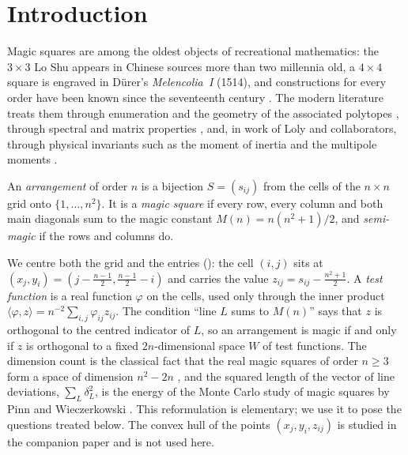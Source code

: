 \section{Introduction}
\label{sec:introduction}

Magic squares are among the oldest objects of recreational mathematics: the $3\times3$ Lo Shu appears in Chinese sources more than two millennia old, a $4\times4$ square is engraved in D\"urer's \emph{Melencolia~I} (1514), and constructions for every order have been known since the seventeenth century \cite{andrews1960magic,pickover2002zen}.
The modern literature treats them through enumeration and the geometry of the associated polytopes \cite{stanley1973magic,ehrhart1973magic,ahmed2003polyhedral,beck2006insideout,beck2010enumeration}, through spectral and matrix properties \cite{loly2009spectra,nordgren2012properties,nordgren2014spectra,cameron2013signatura}, and, in work of Loly and collaborators, through physical invariants such as the moment of inertia and the multipole moments \cite{loly2004invariance,rogers2004inertia,rogers2005multipole}.

\begin{definition}
\label{def:magic_square}
An \emph{arrangement} of order $n$ is a bijection $S=(s_{ij})$ from the cells of the $n\times n$ grid onto $\{1,\dots,n^2\}$.
It is a \emph{magic square} if every row, every column and both main diagonals sum to the magic constant $M(n)=n(n^2+1)/2$, and \emph{semi-magic} if the rows and columns do.
\end{definition}

We centre both the grid and the entries (): the cell $(i,j)$ sits at $(x_j,y_i)=(j-\frac{n-1}2,\frac{n-1}2-i)$ and carries the value $z_{ij}=s_{ij}-\frac{n^2+1}2$.
A \emph{test function} is a real function $\varphi$ on the cells, used only through the inner product $\langle\varphi,z\rangle=n^{-2}\sum_{i,j}\varphi_{ij}z_{ij}$.
The condition ``line $L$ sums to $M(n)$'' says that $z$ is orthogonal to the centred indicator of $L$, so an arrangement is magic if and only if $z$ is orthogonal to a fixed $2n$-dimensional space $W$ of test functions.
The dimension count is the classical fact that the real magic squares of order $n\ge3$ form a space of dimension $n^2-2n$ \cite{ward1980vector}, and the squared length of the vector of line deviations, $\sum_L\delta_L^2$, is the energy of the Monte Carlo study of magic squares by Pinn and Wieczerkowski \cite{pinn1998number}.
This reformulation is elementary; we use it to pose the questions treated below.
The convex hull of the points $(x_j,y_i,z_{ij})$ is studied in the companion paper \cite{mathewson_gems} and is not used here.

